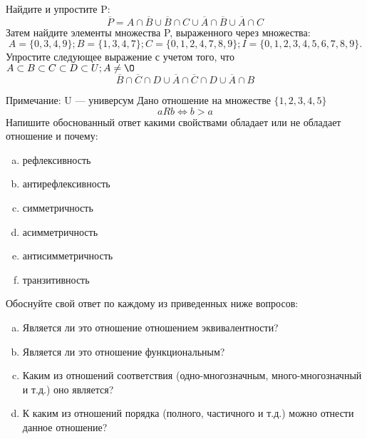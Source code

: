 \documentclass[10pt]{exam}
\begin{document}
\begin{questions}
\question
Найдите и упростите P:
\begin{equation*}
\overline{P} = A \cap \overline{B} \cup \overline{B} \cap C \cup \overline{A} \cap \overline{B} \cup \overline{A} \cap C
\end{equation*}
Затем найдите элементы множества P, выраженного через множества:
\begin{equation*}
A = \{0, 3, 4, 9\}; 
B = \{1, 3, 4, 7\};
C = \{0, 1, 2, 4, 7, 8, 9\};
I = \{0, 1, 2, 3, 4, 5, 6, 7, 8, 9\}.
\end{equation*}\question
Упростите следующее выражение с учетом того, что $A\subset B \subset C \subset D \subset U; A \neq \O$
\begin{equation*}
\overline{B} \cap \overline{C} \cap D \cup \overline{A} \cap \overline{C} \cap D \cup \overline{A} \cap B
\end{equation*}

Примечание: U — универсум\question
Дано отношение на множестве $\{1, 2, 3, 4, 5\}$ 
\begin{equation*}
aRb \iff b > a
\end{equation*}
Напишите обоснованный ответ какими свойствами обладает или не обладает отношение и почему:   
\begin{enumerate} [a)]\setcounter{enumi}{0}
\item рефлексивность
\item антирефлексивность
\item симметричность
\item асимметричность
\item антисимметричность
\item транзитивность
\end{enumerate}

Обоснуйте свой ответ по каждому из приведенных ниже вопросов:
\begin{enumerate} [a)]\setcounter{enumi}{0}
    \item Является ли это отношение отношением эквивалентности?
    \item Является ли это отношение функциональным?
    \item Каким из отношений соответствия (одно-многозначным, много-многозначный и т.д.) оно является?
    \item К каким из отношений порядка (полного, частичного и т.д.) можно отнести данное отношение?
\end{enumerate}


\end{questions}
\end{document}
